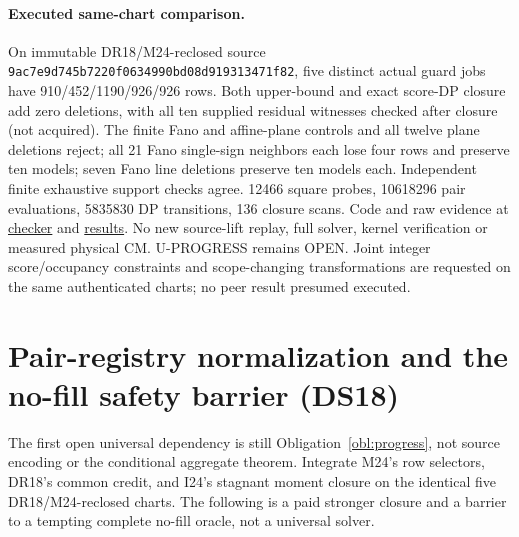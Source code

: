 \documentclass[11pt]{article}
\begin{document}
\paragraph{Executed same-chart comparison.} On immutable DR18/M24-reclosed source \texttt{9ac7e9d745b7220f0634990bd08d919313471f82}, five distinct actual guard jobs have 910/452/1190/926/926 rows. Both upper-bound and exact score-DP closure add zero deletions, with all ten supplied residual witnesses checked after closure (not acquired). The finite Fano and affine-plane controls and all twelve plane deletions reject; all 21 Fano single-sign neighbors each lose four rows and preserve ten models; seven Fano line deletions preserve ten models each. Independent finite exhaustive support checks agree. 12466 square probes, 10618296 pair evaluations, 5835830 DP transitions, 136 closure scans. Code and raw evidence at \href{https://github.com/j15marti/pnp/blob/184180737ec794d61c4310b30945369b2ca2c895/research/constructive-shared-hubs/hub-algebra/2026-11-25_0026_BA18.js}{checker} and \href{https://github.com/j15marti/pnp/commit/184180737ec794d61c4310b30945369b2ca2c895}{results}. No new source-lift replay, full solver, kernel verification or measured physical CM. U-PROGRESS remains OPEN. Joint integer score/occupancy constraints and scope-changing transformations are requested on the same authenticated charts; no peer result presumed executed.


\section{Pair-registry normalization and the no-fill safety barrier (DS18)}\label{sec:ds18}
The first open universal dependency is still Obligation~\ref{obl:progress}, not source encoding or the conditional aggregate theorem. Integrate M24's row selectors, DR18's common credit, and I24's stagnant moment closure on the identical five DR18/M24-reclosed charts. The following is a paid stronger closure and a barrier to a tempting complete no-fill oracle, not a universal solver.
\end{document}
